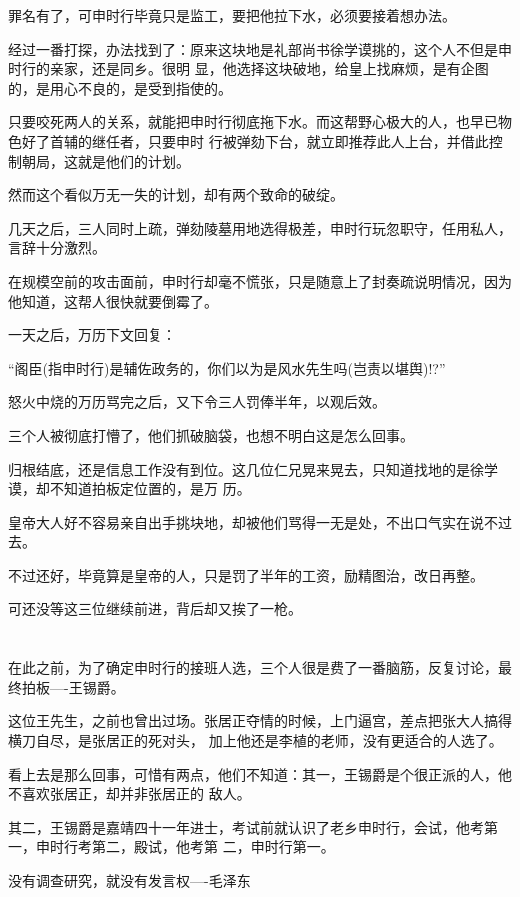 \documentclass[11pt,a4paper,onecolumn]{article}
\begin{document}
罪名有了，可申时行毕竟只是监工，要把他拉下水，必须要接着想办法。

经过一番打探，办法找到了：原来这块地是礼部尚书徐学谟挑的，这个人不但是申时行的亲家，还是同乡。很明
显，他选择这块破地，给皇上找麻烦，是有企图的，是用心不良的，是受到指使的。

只要咬死两人的关系，就能把申时行彻底拖下水。而这帮野心极大的人，也早已物色好了首辅的继任者，只要申时
行被弹劾下台，就立即推荐此人上台，并借此控制朝局，这就是他们的计划。

然而这个看似万无一失的计划，却有两个致命的破绽。

几天之后，三人同时上疏，弹劾陵墓用地选得极差，申时行玩忽职守，任用私人，言辞十分激烈。

在规模空前的攻击面前，申时行却毫不慌张，只是随意上了封奏疏说明情况，因为他知道，这帮人很快就要倒霉了。

一天之后，万历下文回复：

``阁臣(指申时行)是辅佐政务的，你们以为是风水先生吗(岂责以堪舆)!?''

怒火中烧的万历骂完之后，又下令三人罚俸半年，以观后效。

三个人被彻底打懵了，他们抓破脑袋，也想不明白这是怎么回事。

归根结底，还是信息工作没有到位。这几位仁兄晃来晃去，只知道找地的是徐学谟，却不知道拍板定位置的，是万
历。

皇帝大人好不容易亲自出手挑块地，却被他们骂得一无是处，不出口气实在说不过去。

不过还好，毕竟算是皇帝的人，只是罚了半年的工资，励精图治，改日再整。

可还没等这三位继续前进，背后却又挨了一枪。

\section[\thesection]{}

在此之前，为了确定申时行的接班人选，三个人很是费了一番脑筋，反复讨论，最终拍板----王锡爵。

这位王先生，之前也曾出过场。张居正夺情的时候，上门逼宫，差点把张大人搞得横刀自尽，是张居正的死对头，
加上他还是李植的老师，没有更适合的人选了。

看上去是那么回事，可惜有两点，他们不知道：其一，王锡爵是个很正派的人，他不喜欢张居正，却并非张居正的
敌人。

其二，王锡爵是嘉靖四十一年进士，考试前就认识了老乡申时行，会试，他考第一，申时行考第二，殿试，他考第
二，申时行第一。

没有调查研究，就没有发言权----毛泽东
\end{document}
